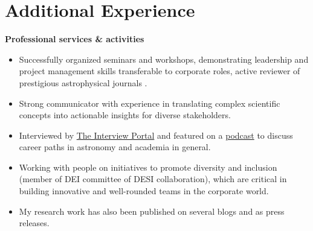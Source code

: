 \documentclass[a4paper,10pt]{article}
\begin{document}
\section*{Additional Experience}
\noindent
\textbf{Professional services \& activities} \\
\begin{itemize}[noitemsep, topsep=0pt]
    \item Successfully organized seminars and workshops, demonstrating leadership and project management skills transferable to corporate roles, active reviewer of prestigious astrophysical journals . 
     \item Strong communicator with experience in translating complex scientific concepts into actionable insights for diverse stakeholders.
    \item Interviewed by \href{https://theinterviewportal.com/2020/03/13/astrophysicist-interview-8/}{The Interview Portal} and featured on a \href{https://www.youtube.com/watch?v=WmA_PnYLeCg}{podcast} to discuss career paths in astronomy and academia in general.
    \item Working with people on initiatives to promote diversity and inclusion (member of DEI committee of DESI collaboration), which are critical in building innovative and well-rounded teams in the corporate world.
    \item My research work has also been published on several blogs and as press releases.
\end{itemize}
\end{document}
